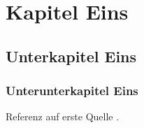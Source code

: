 \section{Kapitel Eins}
\subsection{Unterkapitel Eins}
\subsubsection{Unterunterkapitel Eins}
Referenz auf erste Quelle \cite{refname}.
